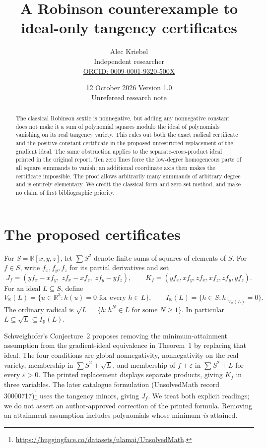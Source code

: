 \documentclass[11pt]{article}
\title{A Robinson counterexample to\\ideal-only tangency certificates}
\author{Alec Kriebel\\\small Independent researcher\\\small\href{https://orcid.org/0009-0001-9320-500X}{ORCID: 0009-0001-9320-500X}}
\date{12 October 2026 \quad Version 1.0\\\small Unrefereed research note}
\newcommand{\SOS}{\sum S^2}
\begin{document}
\maketitle
\begin{abstract}
The classical Robinson sextic is nonnegative, but adding any nonnegative
constant does not make it a sum of polynomial squares modulo the ideal of
polynomials vanishing on its real tangency variety. This rules out both the
exact radical certificate and the positive-constant certificate in the proposed
unrestricted replacement of the gradient ideal. The same obstruction applies
to the separate-cross-product ideal printed in the original report. Ten zero
lines force the low-degree homogeneous parts of all square summands to vanish;
an additional coordinate axis then makes the certificate impossible. The proof
allows arbitrarily many summands of arbitrary degree and is entirely elementary.
We credit the classical form and zero-set method, and make no claim of first
bibliographic priority.
\end{abstract}

\section{The proposed certificates}
For $S=\mathbb R[x,y,z]$, let $\SOS$ denote finite sums of squares of elements of
$S$. For $f\in S$, write $f_x,f_y,f_z$ for its partial derivatives and set
\[
 J_f=(yf_x-xf_y,\;zf_x-xf_z,\;zf_y-yf_z),\qquad
 K_f=(yf_x,xf_y,zf_x,xf_z,zf_y,yf_z).
\]
For an ideal $L\subseteq S$, define
\[
 V_{\mathbb R}(L)=\{u\in\mathbb R^3:h(u)=0\text{ for every }h\in L\},\qquad
 I_{\mathbb R}(L)=\{h\in S:h|_{V_{\mathbb R}(L)}=0\}.
\]
The ordinary radical is $\sqrt L=\{h:h^N\in L\text{ for some }N\ge1\}$.
In particular $L\subseteq\sqrt L\subseteq I_{\mathbb R}(L)$.

Schweighofer's Conjecture~2 \cite[p.~811]{report} proposes removing the
minimum-attainment assumption from the gradient-ideal equivalence in
Theorem~1 \cite[p.~810]{report} by replacing that ideal. The four conditions
are global nonnegativity, nonnegativity on the real variety, membership in
$\SOS+\sqrt L$, and membership of $f+\varepsilon$ in $\SOS+L$ for every
$\varepsilon>0$. The printed replacement displays separate products, giving
$K_f$ in three variables. The later catalogue formulation (UnsolvedMath record 30000717)\footnote{\url{https://huggingface.co/datasets/ulamai/UnsolvedMath}.} uses the tangency
minors, giving $J_f$. We treat both explicit readings; we do not assert an
author-approved correction of the printed formula. Removing an attainment
assumption includes polynomials whose minimum \emph{is} attained.
\end{document}
